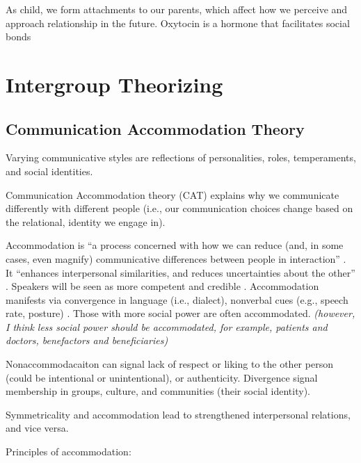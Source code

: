 \documentclass[
]{book}
\begin{document}
\citep{Bowlby_1982} As child, we form attachments to our parents, which affect how we perceive and approach relationship in
the future. Oxytocin is a hormone that facilitates social bonds \citep{Campbell_2010}

\hypertarget{intergroup-theorizing}{%
\section{Intergroup Theorizing}\label{intergroup-theorizing}}

\hypertarget{communication-accommodation-theory}{%
\subsection{Communication Accommodation Theory}\label{communication-accommodation-theory}}

Varying communicative styles are reflections of personalities, roles, temperaments, and social identities.

Communication Accommodation theory (CAT) explains why we communicate differently with different people (i.e., our
communication choices change based on the relational, identity we engage in).

Accommodation is ``a process concerned with how we can reduce (and, in some cases, even magnify) communicative
differences between people in interaction'' \citep[pp.~237]{Baxter_2008}. It ``enhances interpersonal similarities, and reduces
uncertainties about the other'' \citep[pp.~237]{Baxter_2008}. Speakers will be seen as more competent and credible
\citep{Aune_1993}. Accommodation manifests via convergence in language (i.e., dialect), nonverbal cues (e.g., speech rate,
posture) \citep{Li_2001}. Those with more social power are often accommodated. \emph{(however, I think less social power should be
accommodated, for example, patients and doctors, benefactors and beneficiaries)}

Nonaccommodacaiton can signal lack of respect or liking to the other person (could be intentional or unintentional), or
authenticity. Divergence signal membership in groups, culture, and communities (their social identity).

Symmetricality and accommodation lead to strengthened interpersonal relations, and vice versa.

Principles of accommodation:
\end{document}
